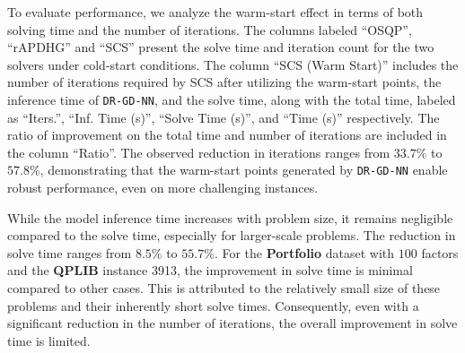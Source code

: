 \documentclass[10pt]{article} %
\begin{document}
To evaluate performance, we analyze the warm-start effect in terms of both solving time and the number of iterations. 
The columns labeled \enquote{OSQP}, \enquote{rAPDHG} and \enquote{SCS} present the solve time and iteration count for the two solvers under cold-start conditions. 
The column \enquote{SCS (Warm Start)} includes the number of iterations required by SCS after utilizing the warm-start points, the inference time of \texttt{DR-GD-NN}, and the solve time, along with the total time, labeled as \enquote{Iters.}, \enquote{Inf. Time (s)}, \enquote{Solve Time (s)}, and \enquote{Time (s)} respectively. 
The ratio of improvement on the total time and number of iterations are included in the column \enquote{Ratio}.
The observed reduction in iterations ranges from $33.7\%$ to $57.8\%$, demonstrating that the warm-start points generated by \texttt{DR-GD-NN} enable robust performance, even on more challenging instances.

While the model inference time increases with problem size, it remains negligible compared to the solve time, especially for larger-scale problems. The reduction in solve time ranges from $8.5\%$ to $55.7\%$. 
For the \textbf{Portfolio} dataset with $100$ factors and the \textbf{QPLIB} instance 3913, the improvement in solve time is minimal compared to other cases. This is attributed to the relatively small size of these problems and their inherently short solve times. Consequently, even with a significant reduction in the number of iterations, the overall improvement in solve time is limited.
\end{document}
